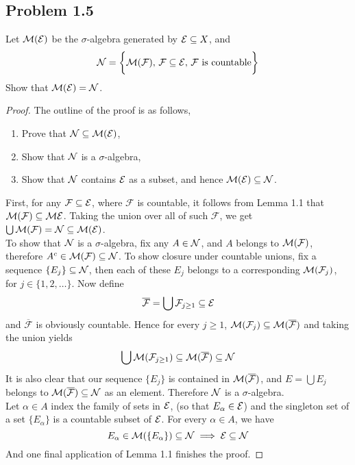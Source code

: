 \documentclass[../../main.tex]{subfiles}
\begin{document}
\subsection*{Problem 1.5}
\begin{wts}
    Let $\mathcal{M}(\mathcal{E})$ be the $\sigma$-algebra generated by $\mathcal{E}\subseteq X$, and 
    \[
    \mathcal{N} =\biggl\{\mathcal{M} (\mathcal{F}),\, \mathcal{F}\subseteq \mathcal{E},\, \mathcal{F} \text{ is countable}\biggr\}
    \]
    Show that $\mathcal{M}(\mathcal{E}) = \mathcal{N}$.
\end{wts}
\begin{proof}
    The outline of the proof is as follows,
    \begin{enumerate}
        \item Prove that $\mathcal{N} \subseteq \mathcal{M}(\mathcal{E})$,
        \item Show that $\mathcal{N}$ is a $\sigma$-algebra,
        \item Show that $\mathcal{N}$ contains $\mathcal{E}$ as a subset, and hence $\mathcal{M}(\mathcal{E})\subseteq \mathcal{N}$.
    \end{enumerate}
    First, for any $\mathcal{F}\subseteq \mathcal{E}$, where $\mathcal{F}$ is countable, it follows from Lemma 1.1 that $\mathcal{M}(\mathcal{F})\subseteq\mathcal{M}{\mathcal{E}}$. Taking the union over all of such $\mathcal{F}$, we get $\bigcup \mathcal{M}(\mathcal{F})=\mathcal{N}\subseteq \mathcal{M}(\mathcal{E})$.\\
    
    To show that $\mathcal{N}$ is a $\sigma$-algebra, fix any $A\in \mathcal{N}$, and $A$ belongs to $\mathcal{M}(\mathcal{F})$, therefore $A^c\in\mathcal{M}(\mathcal{F})\subseteq \mathcal{N}$. To show closure under countable unions, fix a sequence $\{E_j\}\subseteq\mathcal{N}$, then each of these $E_j$ belongs to a corresponding $\mathcal{M}(\mathcal{F}_j)$, for $j\in \{1,2,\ldots\}$. Now define 
    \[
    \overline{\mathcal{F}} = \bigcup \mathcal{F}_{j\geq 1}\subseteq \mathcal{E}
    \]
    and $\overline{\mathcal{F}}$ is obviously countable. Hence for every $j\geq 1$, $\mathcal{M}(\mathcal{F}_j)\subseteq \mathcal{M}(\overline{\mathcal{F}})$ and taking the union yields
    \[
    \bigcup \mathcal{M}(\mathcal{F}_{j\geq 1})\subseteq \mathcal{M} (\overline{\mathcal{F}})\subseteq \mathcal{N}
    \]
    It is also clear that our sequence $\{E_j\}$ is contained in $\mathcal{M}(\overline{\mathcal{F}})$, and $E=\bigcup E_j$ belongs to $\mathcal{M}(\overline{\mathcal{F}})\subseteq\mathcal{N}$ as an element. Therefore $\mathcal{N}$ is a $\sigma$-algebra.\\
    
    Let $\alpha\in A$ index the family of sets in $\mathcal{E}$, (so that $E_\alpha\in\mathcal{E}$) and the singleton set of a set $\{E_\alpha\}$ is a countable subset of $\mathcal{E}$. For every $\alpha\in A$, we have
    \[
    E_\alpha\in\mathcal{M}(\{E_\alpha\})\subseteq\mathcal{N}\implies \mathcal{E}\subseteq\mathcal{N}
    \]
    And one final application of Lemma 1.1 finishes the proof.
\end{proof}
\end{document}

